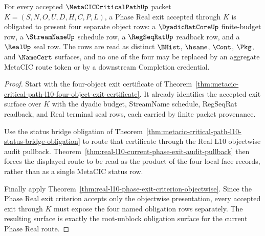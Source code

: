 \begin{theorem}
\label{thm:metacic-critical-path-phase-real-four-face-obligation-surface}
For every accepted $\MetaCICCriticalPathUp$ packet $K=(S,N,O,U,D,H,C,P,L)$, a Phase Real exit accepted through $K$ is obligated to present four separate object rows: a $\DyadicRatCoreUp$ finite-budget row, a $\StreamNameUp$ schedule row, a $\RegSeqRatUp$ readback row, and a $\RealUp$ seal row. The rows are read as distinct $\BHist$, $\hsame$, $\Cont$, $\Pkg$, and $\NameCert$ surfaces, and no one of the four may be replaced by an aggregate MetaCIC route token or by a downstream Completion credential.
\end{theorem}
\begin{proof}
Start with the four-object exit certificate of Theorem~\ref{thm:metacic-critical-path-l10-four-object-exit-certificate}. It already identifies the accepted exit surface over $K$ with the dyadic budget, StreamName schedule, RegSeqRat readback, and Real terminal seal rows, each carried by finite packet provenance.

Use the status bridge obligation of Theorem~\ref{thm:metacic-critical-path-l10-status-bridge-obligation} to route that certificate through the Real L10 objectwise audit pullback. Theorem~\ref{thm:real-l10-current-phase-exit-audit-pullback} then forces the displayed route to be read as the product of the four local face records, rather than as a single MetaCIC status row.

Finally apply Theorem~\ref{thm:real-l10-phase-exit-criterion-objectwise}. Since the Phase Real exit criterion accepts only the objectwise presentation, every accepted exit through $K$ must expose the four named obligation rows separately. The resulting surface is exactly the root-unblock obligation surface for the current Phase Real route.
\end{proof}

